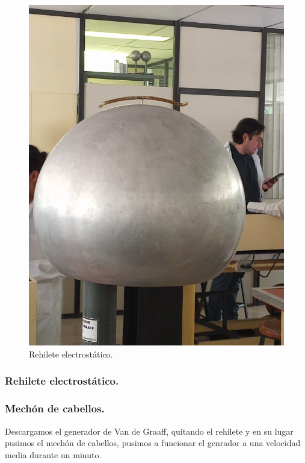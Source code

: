 \documentclass[10pt]{article}
\begin{document}
\begin{multicols}{2}
\begin{figure}[h]
\centering
\includegraphics[scale=0.07]{p14}
\caption{Rehilete electrostático.}
\end{figure}

\subsubsection{Rehilete electrostático.}

\subsubsection{Mechón de cabellos.}
Descargamos el generador de Van de Graaff, quitando el rehilete y en su lugar pusimos el mechón de cabellos, pusimos a funcionar el genrador a una velocidad media durante un minuto.


\end{multicols}
\end{document}
